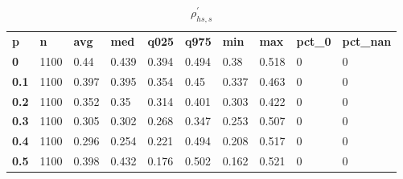 \begin{table}[h]
 \centering 
\footnotesize
\caption{$\rho_{hs,s}^\prime $}
\label{tab:alphahss}
\begin{tabular}[h]{| l l l l l l l l l l|
    } \hline
\textbf{ p} & \textbf{ n} & \textbf{ avg} & \textbf{ med} & \textbf{ q025} & \textbf{ q975} & \textbf{ min} & \textbf{ max} & \textbf{ pct\_0} & \textbf{ pct\_nan}
           \\
  \textbf{  0} & 1100 &  0.44 & 0.439 & 0.394 & 0.494 &  0.38 & 0.518 & 0 & 0
           \\
  \textbf{0.1} & 1100 & 0.397 & 0.395 & 0.354 &  0.45 & 0.337 & 0.463 & 0 & 0
           \\
  \textbf{0.2} & 1100 & 0.352 &  0.35 & 0.314 & 0.401 & 0.303 & 0.422 & 0 & 0
           \\
  \textbf{0.3} & 1100 & 0.305 & 0.302 & 0.268 & 0.347 & 0.253 & 0.507 & 0 & 0
           \\
  \textbf{0.4} & 1100 & 0.296 & 0.254 & 0.221 & 0.494 & 0.208 & 0.517 & 0 & 0
           \\
  \textbf{0.5} & 1100 & 0.398 & 0.432 & 0.176 & 0.502 & 0.162 & 0.521 & 0 & 0
           \\
 \hline \end{tabular}
 \end{table}
